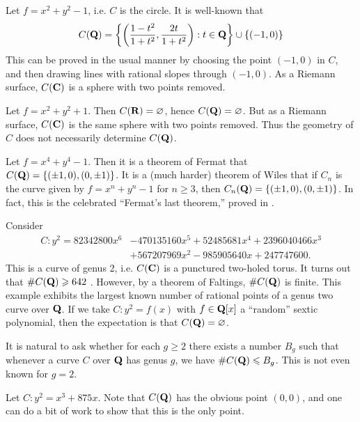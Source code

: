 \begin{example}
Let $f=x^2+y^2-1$, i.e. $C$ is the circle. It is well-known that 
\[
  C(\mathbf{Q})=\left\{\left(\frac{1-t^2}{1+t^2},\frac{2t}{1+t^2}\right):t\in\mathbf{Q}\right\}\cup \{(-1,0)\}
\]
This can be proved in the usual manner by choosing the point $(-1,0)$ in $C$, 
and then drawing lines with rational slopes through $(-1,0)$. As a Riemann 
surface, $C(\mathbf{C})$ is a sphere with two points removed. 
\end{example}

\begin{example}
Let $f=x^2+y^2+1$. Then $C(\mathbf{R})=\varnothing$, hence $C(\mathbf{Q})=\varnothing$. But 
as a Riemann surface, $C(\mathbf{C})$ is the same sphere with two points removed. Thus 
the geometry of $C$ does not necessarily determine $C(\mathbf{Q})$. 
\end{example}

\begin{example}
Let $f=x^4+y^4-1$. Then it is a theorem of Fermat that 
$C(\mathbf{Q})=\{(\pm 1,0),(0,\pm 1)\}$. It is a (much harder) theorem of Wiles that if 
$C_n$ is the curve given by $f=x^n+y^n-1$ for $n\geqslant 3$, then 
$C_n(\mathbf{Q})=\{(\pm 1,0),(0,\pm 1)\}$. In fact, this is the celebrated 
``Fermat's last theorem,'' proved in \cite{wi95}. 
\end{example}

\begin{example}[Stoll]
Consider 
\begin{align*}
  C : y^2 = 82342800 x^6 &- 470135160 x^5 + 52485681 x^4 + 2396040466 x^3 \\
    &+ 567207969 x^2 - 985905640 x + 247747600 \text{.}
\end{align*}
This is a curve of genus 2, i.e. $C(\mathbf{C})$ is a punctured two-holed 
torus. It turns out that $\# C(\mathbf{Q})\geqslant 642$ \cite[\S 6]{st09}. 
However, by a theorem of Faltings, $\# C(\mathbf{Q})$ is finite. This example exhibits 
the largest known number of rational points of a genus two curve 
over $\mathbf{Q}$. If we take $C:y^2=f(x)$ with $f\in\mathbf{Q}[x]$ a 
``random'' sextic polynomial, then the expectation is that 
$C(\mathbf{Q})=\varnothing$. 
\end{example}

It is natural to ask whether for each $g\geqslant 2$ there exists a number 
$B_g$ such that whenever a curve $C$ over $\mathbf{Q}$ has genus $g$, we have 
$\# C(\mathbf{Q})\leqslant B_g$. This is not even known for $g=2$. 

\begin{example}
Let $C:y^2=x^3+875 x$. Note that $C(\mathbf{Q})$ has the obvious point 
$(0,0)$, and one can do a bit of work to show that this is the only point. 
\end{example}

